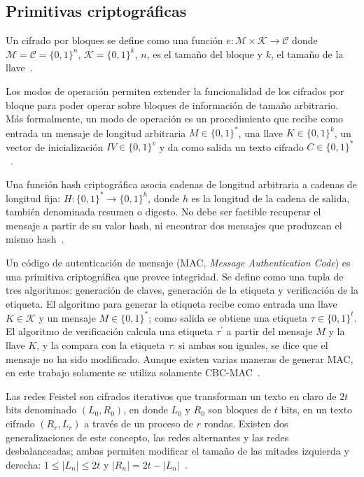 \documentclass[conference]{IEEEtran}
\begin{document}
  \subsection{Primitivas criptográficas}

  Un cifrado por bloques se define como una función $ e: \mathcal{M} \times
  \mathcal{K} \rightarrow \mathcal{C} $ donde $ \mathcal{M} = \mathcal{C} = \{
  0, 1 \}^n $, $ \mathcal{K} = \{ 0, 1 \}^k $, $ n $, es el tamaño del bloque
  y $ k $, el tamaño de la llave~\cite{menezes}.

  Los modos de operación permiten extender la funcionalidad de los cifrados por
  bloque para poder operar sobre bloques de información de tamaño arbitrario.
  Más formalmente, un modo de operación es un procedimiento que recibe como
  entrada un mensaje de longitud arbitraria $ M \in \{ 0, 1 \}^*$, una llave $ K
  \in \{0, 1 \}^k$, un vector de inicialización $IV \in \{ 0, 1 \}^v $ y da como
  salida un texto cifrado $C \in \{ 0, 1 \}^* $~\cite{modos_de_operacion}.

  Una función hash criptográfica asocia cadenas de longitud arbitraria
  a cadenas de longitud fija: $ H:  \{ 0, 1 \}^* \rightarrow \{ 0, 1 \}^h $,
  donde $h$ es la longitud de la cadena de salida, también denominada resumen o
  digesto. No debe ser factible recuperar el mensaje a partir de su valor
  hash, ni encontrar dos mensajes que produzcan el mismo
  hash~\cite{menezes}.

  Un código de autenticación de mensaje (MAC, \textit{Message Authentication
  Code}) es una primitiva criptográfica que provee integridad. Se define como
  una tupla de tres algoritmos: generación de claves, generación de la etiqueta
  y verificación de la etiqueta. El algoritmo para generar la etiqueta recibe
  como entrada una llave $K \in \mathcal{K}$ y un mensaje $M \in \{ 0, 1 \}^*$;
  como salida se obtiene una etiqueta $\tau \in \{ 0, 1 \}^t$. El algoritmo de
  verificación calcula una etiqueta $\tau^\prime$ a partir del mensaje $M$ y
  la llave $K$, y la compara con la etiqueta $\tau$: si ambas son iguales, se
  dice que el mensaje no ha sido modificado. Aunque existen varias maneras de
  generar MAC, en este trabajo solamente se utiliza solamente 
  CBC-MAC~\cite{DBLP:journals/rfc/rfc3610}.

  Las redes Feistel son cifrados iterativos que transforman un texto en claro de
  $ 2t $ bits denominado $ (L_0, R_0) $, en donde $ L_0 $ y $ R_0 $ son bloques
  de $ t $ bits, en un texto cifrado $ (R_r, L_r) $ a través de un proceso de $
  r $ rondas. Existen dos generalizaciones de este concepto, las redes
  alternantes y las redes desbalanceadas; ambas permiten modificar el tamaño de
  las mitades izquierda y derecha: $ 1 \leq | L_n | \leq 2t $ y $ | R_n | = 2t -
  | L_n | $~\cite{DBLP:conf/fse/SchneierK96}.
\end{document}
